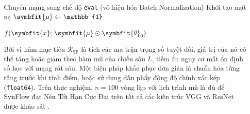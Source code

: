 \begin{algorithm}[H]
    \caption{Iterative Synaptic Flow Pruning -- SynFlow}
    \label{alg:synflow}
    \DontPrintSemicolon
    \SetAlgoLined


    \BlankLine
    Chuyển mạng sang chế độ \texttt{eval} (vô hiệu hóa Batch Normalization)\;
    Khởi tạo mặt nạ $\symbfit{\mu} \leftarrow \mathbb{1}$ 

    \BlankLine

    \BlankLine
    \Return $f\!\left(\symbfit{x};\,\symbfit{\mu}\odot\symbfit{\theta}_0\right)$\;
\end{algorithm}

\noindent
Bởi vì hàm mục tiêu $\mathcal{R}_{\mathrm{SF}}$ là tích các ma trận trọng số
tuyệt đối, giá trị của nó có thể tăng hoặc giảm theo hàm mũ của chiều sâu $L$,
tiềm ẩn nguy cơ mất ổn định số học với mạng rất sâu. Một biện pháp khắc phục
đơn giản là chuẩn hóa từng tầng trước khi tính điểm, hoặc sử dụng dấu phẩy
động độ chính xác kép (\texttt{float64}). Trên thực nghiệm, $n = 100$ vòng lặp với lịch trình
mũ là đủ để SynFlow đạt Nén Tới Hạn Cực Đại trên tất cả các kiến trúc VGG và
ResNet được khảo sát \cite{synflow}.

